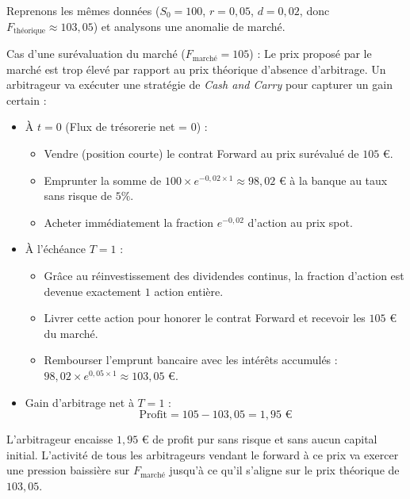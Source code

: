 \begin{examplebox}
Reprenons les mêmes données ($S_0 = 100$, $r = 0,05$, $d = 0,02$, donc $F_{\text{théorique}} \approx 103,05$) et analysons une anomalie de marché.

Cas d'une surévaluation du marché ($F_{\text{marché}} = 105$) :
Le prix proposé par le marché est trop élevé par rapport au prix théorique d'absence d'arbitrage. Un arbitrageur va exécuter une stratégie de \textit{Cash and Carry} pour capturer un gain certain :
\begin{itemize}[label=$\rightarrow$]
    \item À $t = 0$ (Flux de trésorerie net = $0$) : 
    \begin{itemize}[label=$\cdot$]
        \item Vendre (position courte) le contrat Forward au prix surévalué de $105$ €.
        \item Emprunter la somme de $100 \times e^{-0,02 \times 1} \approx 98,02$ € à la banque au taux sans risque de $5\%$.
        \item Acheter immédiatement la fraction $e^{-0,02}$ d'action au prix spot.
    \end{itemize}
    \item À l'échéance $T = 1$ :
    \begin{itemize}[label=$\cdot$]
        \item Grâce au réinvestissement des dividendes continus, la fraction d'action est devenue exactement $1$ action entière.
        \item Livrer cette action pour honorer le contrat Forward et recevoir les $105$ € du marché.
        \item Rembourser l'emprunt bancaire avec les intérêts accumulés : $98,02 \times e^{0,05 \times 1} \approx 103,05$ €.
    \end{itemize}
    \item Gain d'arbitrage net à $T = 1$ : 
    \begin{equation*}
        \text{Profit} = 105 - 103,05 = 1,95 \text{ €}
    \end{equation*}
\end{itemize}
L'arbitrageur encaisse $1,95$ € de profit pur sans risque et sans aucun capital initial. L'activité de tous les arbitrageurs vendant le forward à ce prix va exercer une pression baissière sur $F_{\text{marché}}$ jusqu'à ce qu'il s'aligne sur le prix théorique de $103,05$.
\end{examplebox}

